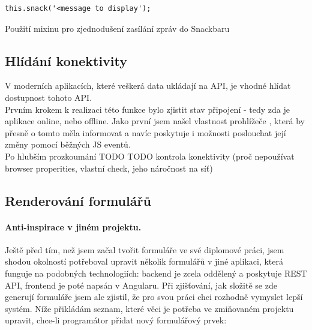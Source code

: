 \begin{listing}[h]
\begin{verbatim}
this.snack('<message to display');
\end{verbatim}
\caption{Použití mixinu pro zjednodušení zasílání zpráv do Snackbaru} \label{code:snack-mixin}
\end{listing}


\subsection{Hlídání konektivity}

V moderních aplikacích, které veškerá data ukládají na API, je vhodné hlídat dostupnost tohoto API.\\
Prvním krokem k realizaci této funkce bylo zjistit stav připojení - tedy zda je aplikace online, nebo offline. Jako první jsem našel vlastnost prohlížeče  \cite{online}, která by přesně o tomto měla informovat a navíc poskytuje i možnosti poslouchat její změny pomocí běžných JS eventů.\\
Po hlubším prozkoumání TODO
TODO kontrola konektivity (proč nepoužívat browser properities, vlastní check, jeho náročnost na síť)


\subsection{Renderování formulářů} \label{implementation:formRender}

\paragraph{Anti-inspirace v jiném projektu.} Ještě před tím, než jsem začal tvořit formuláře ve své diplomové práci, jsem shodou okolností potřeboval upravit několik formulářů v jiné aplikaci, která funguje na podobných technologiích: backend je zcela oddělený a poskytuje REST API, frontend je poté napsán v Angularu. Při zjišťování, jak složitě se zde generují formuláře jsem ale zjistil, že pro svou práci chci rozhodně vymyslet lepší systém. Níže přikládám seznam, které věci je potřeba ve zmiňovaném projektu upravit, chce-li programátor přidat nový formulářový prvek:

